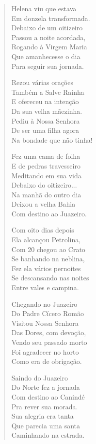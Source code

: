 \begin{verse}
Helena viu que estava \\
Em donzela transformada. \\
Debaixo de um oitizeiro \\
Passou a noite acordada, \\
Rogando à Virgem Maria \\
Que amanhecesse o dia \\
Para seguir sua jornada. 

Rezou várias orações \\
Também a Salve Rainha \\
E ofereceu na intenção \\
Da sua velha mãezinha. \\
Pediu à Nossa Senhora \\
De ser uma filha agora \\
Na bondade que não tinha! 

Fez uma cama de folha \\
E de pedras travesseiro \\
Meditando em sua vida \\
Debaixo do oitizeiro... \\
Na manhã do outro dia \\
Deixou a velha Bahia \\
Com destino ao Juazeiro. 
\pagebreak

Com oito dias depois \\
Ela alcançou Petrolina, \\
Com 20 chegou ao Crato \\
Se banhando na neblina, \\
Fez ela vários pernoites \\
Se descansando nas noites \\
Entre vales e campina. 

Chegando no Juazeiro \\
Do Padre Cícero Romão \\
Visitou Nossa Senhora \\
Das Dores, com devoção, \\
Vendo seu passado morto \\
Foi agradecer no horto \\
Como era de obrigação. 

Saindo do Juazeiro \\
Do Norte fez a jornada \\
Com destino ao Canindé \\
Pra rever sua morada. \\
Sua alegria era tanta \\
Que parecia uma santa \\
Caminhando na estrada. 


\end{verse}
